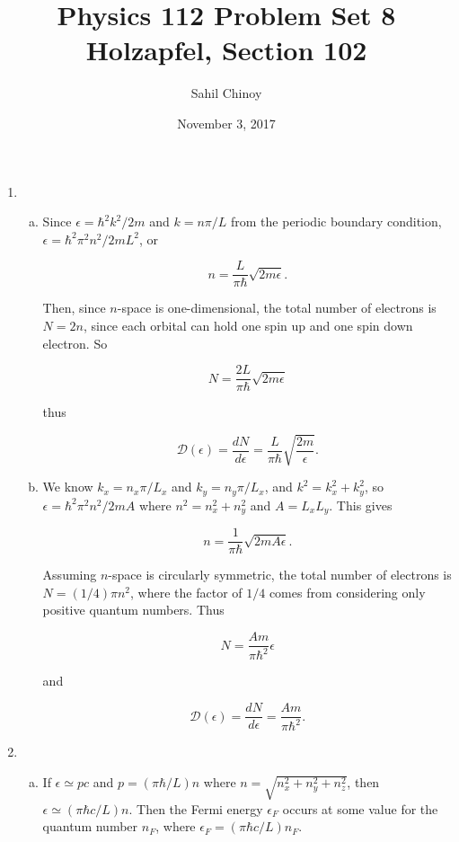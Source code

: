 \documentclass{article}
\title{Physics 112 Problem Set 8 \\ \large{Holzapfel, Section 102}}
\author{Sahil Chinoy}
\date{November 3, 2017}
\begin{document}
\maketitle{}

\begin{enumerate}

	\item

	\begin{enumerate}[(a)]

		\item

		Since $\epsilon = \hbar^2 k^2 /2m$ and $k = n\pi/L$ from the periodic boundary condition, $\epsilon = \hbar^2 \pi^2 n^2 / 2mL^2$, or

		$$n = \frac{L}{\pi \hbar} \sqrt{2m\epsilon}.$$

		Then, since $n$-space is one-dimensional, the total number of electrons is $N = 2n$, since each orbital can hold one spin up and one spin down electron. So

		$$N = \frac{2L}{\pi \hbar} \sqrt{2m\epsilon}$$

		thus

		$$\mathcal{D}(\epsilon) = \frac{dN}{d\epsilon} = \frac{L}{\pi\hbar} \sqrt{\frac{2m}{\epsilon}}.$$

		\item

		We know $k_x = n_x \pi /L_x$ and $k_y = n_y \pi / L_x$, and $k^2 = k_x^2 + k_y^2$, so $\epsilon = \hbar^2 \pi^2 n^2 / 2mA$ where $n^2 = n_x^2 + n_y^2$ and $A = L_x L_y$. This gives

		$$n = \frac{1}{\pi \hbar} \sqrt{2m A \epsilon}.$$

		Assuming $n$-space is circularly symmetric, the total number of electrons is $N = (1/4) \pi n^2$, where the factor of $1/4$ comes from considering only positive quantum numbers. Thus

		$$N = \frac{Am}{\pi\hbar^2} \epsilon$$

		and

		$$\mathcal{D}(\epsilon) = \frac{dN}{d\epsilon} = \frac{Am}{\pi \hbar^2}.$$

	\end{enumerate}

	\item

	\begin{enumerate}[(a)]

		\item

		If $\epsilon \simeq pc$ and $p = (\pi \hbar / L) n$ where $n = \sqrt{n_x^2 + n_y^2 + n_z^2}$, then $\epsilon \simeq (\pi \hbar c / L) n$. Then the Fermi energy $\epsilon_F$ occurs at some value for the quantum number $n_F$, where $\epsilon_F = (\pi \hbar c / L) n_F$.


\end{enumerate}
\end{enumerate}
\end{document}
